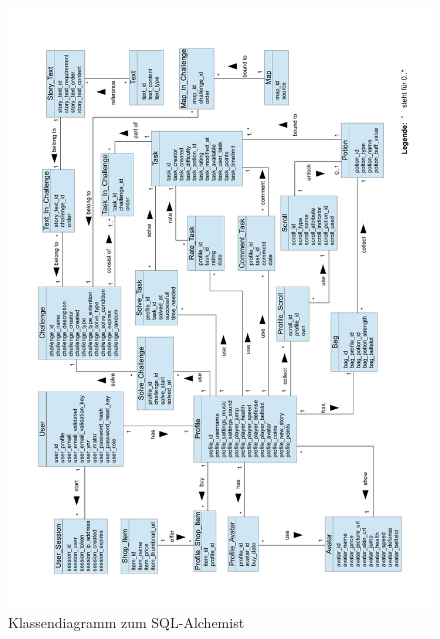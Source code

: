 \begin{figure}[h]
\centering
\includegraphics[width=1.0\textwidth]{figures/Klassen-Diagramm-final.pdf}
\caption{Klassendiagramm zum SQL-Alchemist}
\label{datenmodell}
\end{figure}
\newpage
\newpage



%
%
%
